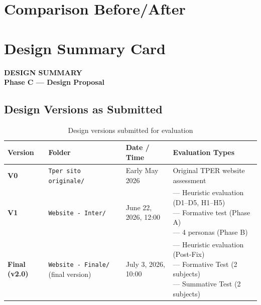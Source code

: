 ﻿\documentclass[11pt,a4paper]{article}
\begin{document}
\newpage
\section{Comparison Before/After}
\label{sec:comparison}




\newpage
\section{Design Summary Card}
\label{sec:design-summary}

\begin{tcolorbox}[headerbox]
 \color{white}\LARGE\bfseries\sffamily DESIGN SUMMARY \\[0.1cm]
 \color{white!80}\small\sffamily Phase C --- Design Proposal
\end{tcolorbox}

\vspace{0.3cm}

\subsection*{Design Versions as Submitted}

\begin{table}[H]
\centering
\small
\renewcommand{\arraystretch}{1.3}
\begin{tabular}{|p{2.2cm}|p{3.2cm}|p{2.8cm}|p{4.2cm}|}
\hline
\textbf{Version} & \textbf{Folder} & \textbf{Date / Time} & \textbf{Evaluation Types} \\
\hline
\textbf{V0} 
& \texttt{Tper sito originale/}
& Early May 2026
& Original TPER website assessment \\
\hline
\textbf{V1} 
& \texttt{Website - Inter/}
& June 22, 2026, 12:00
& \parbox{4.5cm}{\raggedright --- Heuristic evaluation (D1--D5, H1--H5) \\ --- Formative test (Phase A) \\ --- 4 personas (Phase B)} \\
\hline
\textbf{Final (v2.0)} 
& \texttt{Website - Finale/} (final version)
& July 3, 2026, 10:00
& \parbox{3.8cm}{\raggedright --- Heuristic evaluation (Post-Fix) \\ --- Formative Test (2 subjects) \\ --- Summative Test (2 subjects)} \\
\hline
\end{tabular}
\caption{Design versions submitted for evaluation}
\label{tab:design-versions}
\end{table}
\end{document}

